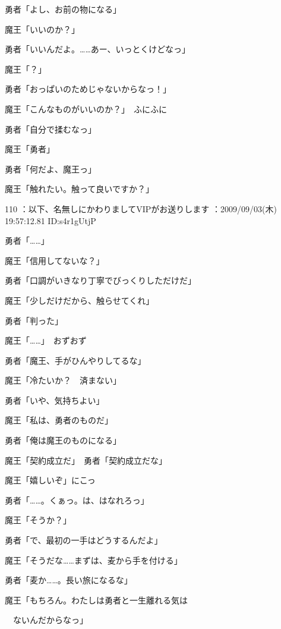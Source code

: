 \documentclass[a4j,twocolumn]{tarticle}
\begin{document}
勇者「よし、お前の物になる」\par{} 
魔王「いいのか？」 



勇者「いいんだよ。……あー、いっとくけどなっ」\par{} 
魔王「？」\par{} 
勇者「おっぱいのためじゃないからなっ！」 



魔王「こんなものがいいのか？」　ふにふに\par{} 
勇者「自分で揉むなっ」 



魔王「勇者」\par{} 
勇者「何だよ、魔王っ」 



魔王「触れたい。触って良いですか？」

	 

	

110 ：以下、名無しにかわりましてVIPがお送りします ：2009/09/03(木) 19:57:12.81 ID:s4r1gUtjP 


勇者「……」\par{} 
魔王「信用してないな？」 



勇者「口調がいきなり丁寧でびっくりしただけだ」\par{} 
魔王「少しだけだから、触らせてくれ」\par{} 
勇者「判った」\par{} 
魔王「……」　おずおず 



勇者「魔王、手がひんやりしてるな」\par{} 
魔王「冷たいか？　済まない」\par{} 
勇者「いや、気持ちよい」 



魔王「私は、勇者のものだ」\par{} 
勇者「俺は魔王のものになる」 



魔王「契約成立だ」　勇者「契約成立だな」 



魔王「嬉しいぞ」にこっ\par{} 
勇者「……。くぁっ。は、はなれろっ」\par{} 
魔王「そうか？」\par{} 
勇者「で、最初の一手はどうするんだよ」 



魔王「そうだな……まずは、麦から手を付ける」\par{} 
勇者「麦か……。長い旅になるな」\par{} 
魔王「もちろん。わたしは勇者と一生離れる気は\par{} 
　ないんだからなっ」 
\end{document}
